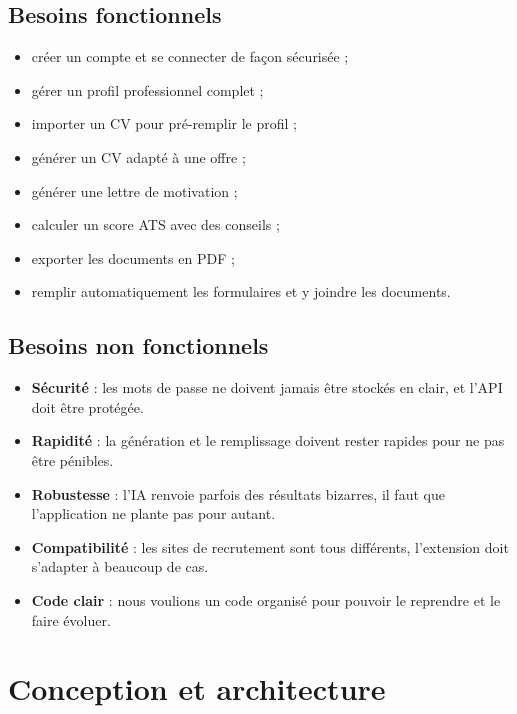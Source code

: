 \documentclass[12pt,a4paper]{report}
\begin{document}
\section{Besoins fonctionnels}
\begin{itemize}[leftmargin=1.4em, itemsep=2pt]
  \item cr\'eer un compte et se connecter de fa\c{c}on s\'ecuris\'ee ;
  \item g\'erer un profil professionnel complet ;
  \item importer un CV pour pr\'e-remplir le profil ;
  \item g\'en\'erer un CV adapt\'e \`a une offre ;
  \item g\'en\'erer une lettre de motivation ;
  \item calculer un score ATS avec des conseils ;
  \item exporter les documents en PDF ;
  \item remplir automatiquement les formulaires et y joindre les documents.
\end{itemize}

\section{Besoins non fonctionnels}
\begin{itemize}[leftmargin=1.4em, itemsep=2pt]
  \item \textbf{S\'ecurit\'e} : les mots de passe ne doivent jamais \^etre stock\'es en
  clair, et l'API doit \^etre prot\'eg\'ee.
  \item \textbf{Rapidit\'e} : la g\'en\'eration et le remplissage doivent rester
  rapides pour ne pas \^etre p\'enibles.
  \item \textbf{Robustesse} : l'IA renvoie parfois des r\'esultats bizarres, il
  faut que l'application ne plante pas pour autant.
  \item \textbf{Compatibilit\'e} : les sites de recrutement sont tous diff\'erents,
  l'extension doit s'adapter \`a beaucoup de cas.
  \item \textbf{Code clair} : nous voulions un code organis\'e pour pouvoir le
  reprendre et le faire \'evoluer.
\end{itemize}

\chapter{Conception et architecture}
\end{document}
